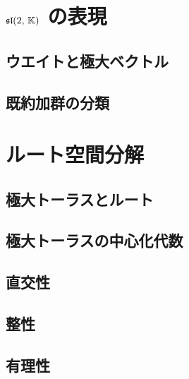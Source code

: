 \documentclass[rep_main]{subfiles}
\begin{document}
\section{$\mathfrak{sl}(2,\, \mathbb{K})$ の表現}

\subsection{ウエイトと極大ベクトル}
\subsection{既約加群の分類}

\section{ルート空間分解}

\subsection{極大トーラスとルート}
\subsection{極大トーラスの中心化代数}
\subsection{直交性}
\subsection{整性}
\subsection{有理性}
\end{document}
